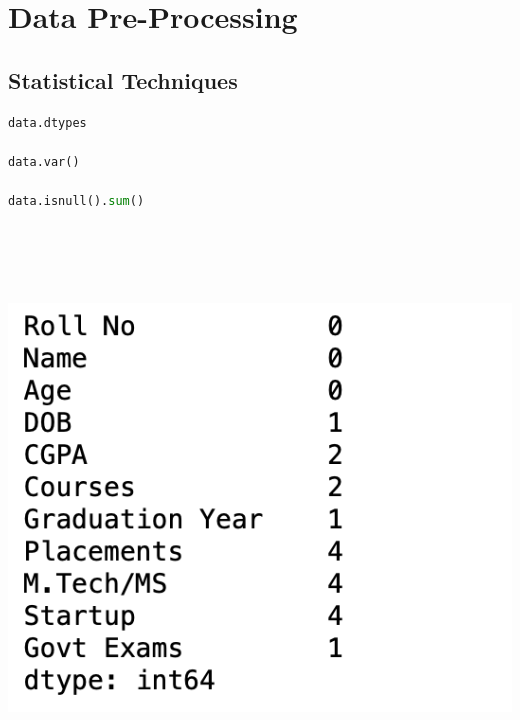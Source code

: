 \documentclass{article}
\begin{document}
\section{Data Pre-Processing}
\subsection{Statistical Techniques}
\begin{lstlisting}[language=Python]
data.dtypes

data.var()

data.isnull().sum()
    
\end{lstlisting}\\\\\
\includegraphics[sclae=0.5]{images/five.png}\\\\\\\
\end{document}
